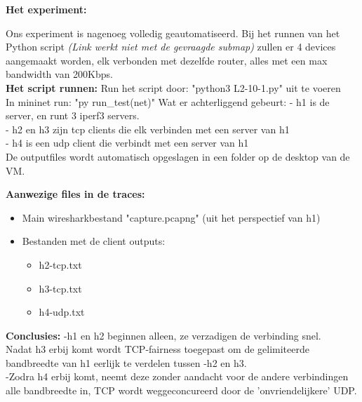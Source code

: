 \textbf{Het experiment:}

Ons experiment is nagenoeg volledig geautomatiseerd. Bij het runnen van het Python script  \textit{(Link werkt niet met de gevraagde submap)} zullen er 4 devices aangemaakt worden, elk verbonden met dezelfde router, alles met een max bandwidth van 200Kbps.\\

\textbf{Het script runnen:}
Run het script door: "python3 L2-10-1.py" uit te voeren\\
In mininet run: "py run\_test(net)"
Wat er achterliggend gebeurt:
- h1 is de server, en runt 3 iperf3 servers.\\
- h2 en h3 zijn tcp clients die elk verbinden met een server van h1\\
- h4 is een udp client die verbindt met een server van h1\\
De outputfiles wordt automatisch opgeslagen in een folder op de desktop van de VM.

\textbf{Aanwezige files in de traces:}
\begin{itemize}
    \item Main wiresharkbestand "capture.pcapng" (uit het perspectief van h1)
    \item Bestanden met de client outputs:
    \begin{itemize}
        \item h2-tcp.txt
        \item h3-tcp.txt
        \item h4-udp.txt
    \end{itemize}
\end{itemize}

\textbf{Conclusies:}
-h1 en h2 beginnen alleen, ze verzadigen de verbinding snel.\\
Nadat h3 erbij komt wordt TCP-fairness toegepast om de gelimiteerde bandbreedte van h1 eerlijk te verdelen tussen -h2 en h3.\\
-Zodra h4 erbij komt, neemt deze zonder aandacht voor de andere verbindingen alle bandbreedte in, TCP wordt weggeconcureerd door de 'onvriendelijkere' UDP.\\